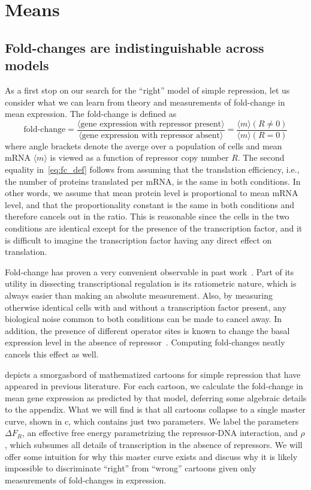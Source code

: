 \section{Means}
\subsection{Fold-changes are indistinguishable across models}
As a first stop on our search for the ``right'' model of simple repression, let
us consider what we can learn from theory and measurements of fold-change in
mean expression. The fold-change is defined as
\begin{equation}
\text{fold-change}
= \frac{\langle \text{gene expression with repressor present} \rangle}
        {\langle \text{gene expression with repressor absent} \rangle}
= \frac{\langle m\rangle(R\ne 0)}{\langle m\rangle(R = 0)}
\label{eq:fc_def}
\end{equation}
where angle brackets denote the averge over a population of cells and mean mRNA
$\langle m\rangle$ is viewed as a function of repressor copy number $R$. The
second equality in~\ref{eq:fc_def} follows from assuming that the translation
efficiency, i.e., the number of proteins translated per mRNA, is the same in
both conditions. In other words, we assume that mean protein level is
proportional to mean mRNA level, and that the proportionality constant is the
same in both conditions and therefore cancels out in the ratio. This is
reasonable since the cells in the two conditions are identical except for the
presence of the transcription factor, and it is difficult to imagine the
transcription factor having any direct effect on translation.

Fold-change has proven a very convenient observable in past
work~\cite{Garcia2011a, Razo-Mejia2018, Chure2019}. Part of its utility in
dissecting transcriptional regulation is its ratiometric nature, which is always
easier than making an absolute measurement. Also, by measuring otherwise
identical cells with and without a transcription factor present, any biological
noise common to both conditions can be made to cancel away. In addition, the
presence of different operator sites is known to change the basal expression
level in the absence of repressor~. Computing fold-changes
neatly cancels this effect as well.

 depicts a smorgasbord of mathematized cartoons for
simple repression that have appeared in previous literature. For each cartoon,
we calculate the fold-change in mean gene expression as predicted by that model,
deferring some algebraic details to the appendix. What we will find is that all
cartoons collapse to a single master curve, shown in c,
which contains just two parameters. We label the parameters $\Delta F_R$, an
effective free energy parametrizing the repressor-DNA interaction, and $\rho$,
which subsumes all details of transcription in the absence of repressors. We
will offer some intuition for why this master curve exists and discuss why it is
likely impossible to discriminate ``right'' from ``wrong'' cartoons given only
measurements of fold-changes in expression.

